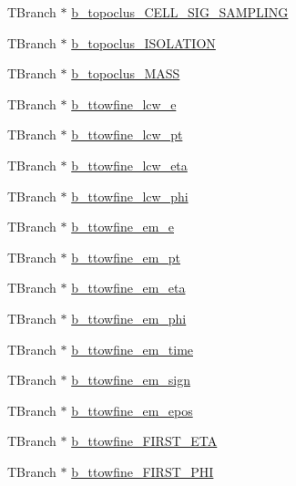 \begin{DoxyCompactItemize}
\item 
T\+Branch $\ast$ \hyperlink{classCollectionTree_a0a15652e7c35213049bcfccbd4ff5154}{b\+\_\+topoclus\+\_\+\+C\+E\+L\+L\+\_\+\+S\+I\+G\+\_\+\+S\+A\+M\+P\+L\+I\+NG}
\item 
T\+Branch $\ast$ \hyperlink{classCollectionTree_aa9560244f18c3f19f2c993377e6a604d}{b\+\_\+topoclus\+\_\+\+I\+S\+O\+L\+A\+T\+I\+ON}
\item 
T\+Branch $\ast$ \hyperlink{classCollectionTree_a1e952f459c70d0a85cb8797d8f6235d2}{b\+\_\+topoclus\+\_\+\+M\+A\+SS}
\item 
T\+Branch $\ast$ \hyperlink{classCollectionTree_af4506b4f536ba0de56a266014ca61b7d}{b\+\_\+ttowfine\+\_\+lcw\+\_\+e}
\item 
T\+Branch $\ast$ \hyperlink{classCollectionTree_afe9b657adb940a0ad84a7903a0a8ab63}{b\+\_\+ttowfine\+\_\+lcw\+\_\+pt}
\item 
T\+Branch $\ast$ \hyperlink{classCollectionTree_a887c614dd12b9afbd7198e77d8754742}{b\+\_\+ttowfine\+\_\+lcw\+\_\+eta}
\item 
T\+Branch $\ast$ \hyperlink{classCollectionTree_ad6a3fa3f30dce1a824c14dfc0494856a}{b\+\_\+ttowfine\+\_\+lcw\+\_\+phi}
\item 
T\+Branch $\ast$ \hyperlink{classCollectionTree_ab05ce86d92a04bcea90e94b3300b1777}{b\+\_\+ttowfine\+\_\+em\+\_\+e}
\item 
T\+Branch $\ast$ \hyperlink{classCollectionTree_ae867a84b826025de74a0fd1b52675309}{b\+\_\+ttowfine\+\_\+em\+\_\+pt}
\item 
T\+Branch $\ast$ \hyperlink{classCollectionTree_a77e6a4915352dd755fd82a0df9e0f852}{b\+\_\+ttowfine\+\_\+em\+\_\+eta}
\item 
T\+Branch $\ast$ \hyperlink{classCollectionTree_a19ac7f5c7e2fe10dbcba55811d689bf2}{b\+\_\+ttowfine\+\_\+em\+\_\+phi}
\item 
T\+Branch $\ast$ \hyperlink{classCollectionTree_a5f01f8d814067f4716bf1fb9349e5004}{b\+\_\+ttowfine\+\_\+em\+\_\+time}
\item 
T\+Branch $\ast$ \hyperlink{classCollectionTree_aa82c79d370449f61cf20874d4f38095e}{b\+\_\+ttowfine\+\_\+em\+\_\+sign}
\item 
T\+Branch $\ast$ \hyperlink{classCollectionTree_ac0f9dd99ad2239b84199f0f3f324b94d}{b\+\_\+ttowfine\+\_\+em\+\_\+epos}
\item 
T\+Branch $\ast$ \hyperlink{classCollectionTree_a782a1fddff1f88ad6a3213c40866a57b}{b\+\_\+ttowfine\+\_\+\+F\+I\+R\+S\+T\+\_\+\+E\+TA}
\item 
T\+Branch $\ast$ \hyperlink{classCollectionTree_a8d752c793184e897c0e2bc20d4d2ac03}{b\+\_\+ttowfine\+\_\+\+F\+I\+R\+S\+T\+\_\+\+P\+HI}

\end{DoxyCompactItemize}
